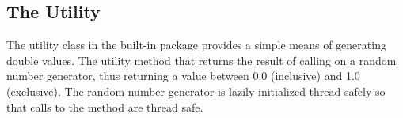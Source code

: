 \subsection{The  Utility}

The  utility class in the built-in  package
provides a simple means of generating double values.  The utility
method  that returns the result of calling
 on a random number generator, thus returning a
value between 0.0 (inclusive) and 1.0 (exclusive).  The random number
generator is lazily initialized thread safely so that calls to the
method are thread safe.









